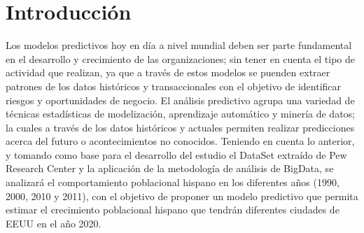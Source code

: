\section{Introducción}
	Los modelos predictivos hoy en día a nivel mundial deben ser parte fundamental en el desarrollo y crecimiento de las organizaciones; sin tener en cuenta el tipo de actividad que realizan, ya que a través de estos modelos se puenden extraer patrones de los datos históricos y transaccionales con el objetivo de identificar riesgos y oportunidades de negocio. El análisis predictivo agrupa una variedad de técnicas estadísticas de modelización, aprendizaje automático y minería de datos; la cuales  a través de los datos históricos y actuales permiten realizar predicciones acerca del futuro o acontecimientos no conocidos. Teniendo en cuenta lo anterior, y tomando como base para el desarrollo del estudio el DataSet extraído de Pew Research Center y la aplicación de la metodología de análisis de BigData, se analizará el comportamiento poblacional hispano en los diferentes años (1990, 2000, 2010 y 2011), con el objetivo de proponer un modelo predictivo que permita estimar el crecimiento poblacional hispano que tendrán diferentes ciudades de EEUU en el año 2020.